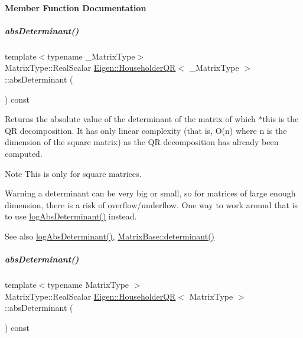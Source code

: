 \paragraph{Member Function Documentation}
\mbox{\label{group___q_r___module_a426973a8d79b6295ebca5bf27942937b}} 
\subparagraph{\texorpdfstring{abs\+Determinant()}{absDeterminant()}\hspace{0.1cm}{\footnotesize\ttfamily [1/2]}}
{\footnotesize\ttfamily template$<$typename \+\_\+\+Matrix\+Type$>$ \\
Matrix\+Type\+::\+Real\+Scalar \hyperlink{group___q_r___module_class_eigen_1_1_householder_q_r}{Eigen\+::\+Householder\+QR}$<$ \+\_\+\+Matrix\+Type $>$\+::abs\+Determinant (\begin{DoxyParamCaption}{ }\end{DoxyParamCaption}) const}

\begin{DoxyReturn}{Returns}
the absolute value of the determinant of the matrix of which $\ast$this is the QR decomposition. It has only linear complexity (that is, O(n) where n is the dimension of the square matrix) as the QR decomposition has already been computed.
\end{DoxyReturn}
\begin{DoxyNote}{Note}
This is only for square matrices.
\end{DoxyNote}
\begin{DoxyWarning}{Warning}
a determinant can be very big or small, so for matrices of large enough dimension, there is a risk of overflow/underflow. One way to work around that is to use \hyperlink{group___q_r___module_af61b6dbef34fc51c825182b16dc43ca1}{log\+Abs\+Determinant()} instead.
\end{DoxyWarning}
\begin{DoxySeeAlso}{See also}
\hyperlink{group___q_r___module_af61b6dbef34fc51c825182b16dc43ca1}{log\+Abs\+Determinant()}, \hyperlink{group___core___module_a7ad8f77004bb956b603bb43fd2e3c061}{Matrix\+Base\+::determinant()} 
\end{DoxySeeAlso}
\mbox{\label{group___q_r___module_aaf4ef26c0b7affc91431ec59c92d64c3}} 
\subparagraph{\texorpdfstring{abs\+Determinant()}{absDeterminant()}\hspace{0.1cm}{\footnotesize\ttfamily [2/2]}}
{\footnotesize\ttfamily template$<$typename Matrix\+Type $>$ \\
Matrix\+Type\+::\+Real\+Scalar \hyperlink{group___q_r___module_class_eigen_1_1_householder_q_r}{Eigen\+::\+Householder\+QR}$<$ Matrix\+Type $>$\+::abs\+Determinant (\begin{DoxyParamCaption}{ }\end{DoxyParamCaption}) const}

